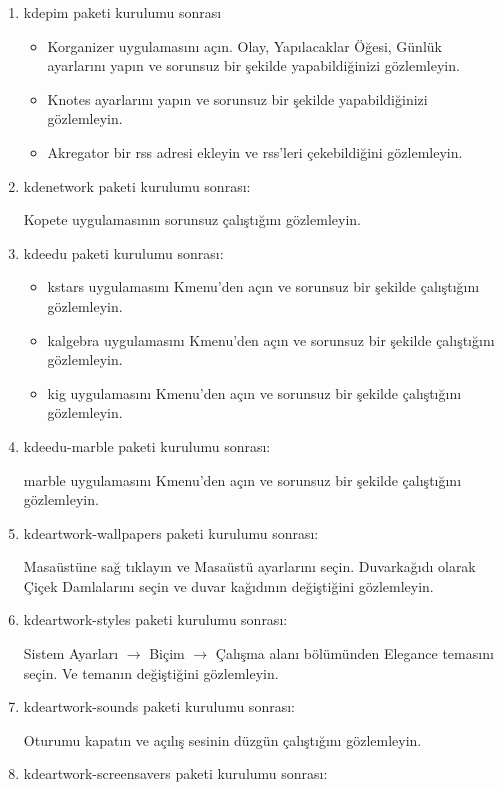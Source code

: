 \documentclass[a4paper,10pt]{article}
\begin{document}
\begin{enumerate}
\item kdepim paketi kurulumu sonrası
\begin{itemize}
 \item Korganizer uygulamasını açın. Olay, Yapılacaklar Öğesi, Günlük ayarlarını yapın ve sorunsuz bir şekilde yapabildiğinizi gözlemleyin.
 \item Knotes ayarlarını yapın ve sorunsuz bir şekilde yapabildiğinizi gözlemleyin.
 \item Akregator bir rss adresi ekleyin ve rss'leri çekebildiğini gözlemleyin.
\end{itemize}

\item kdenetwork paketi kurulumu sonrası: 

Kopete uygulamasının sorunsuz çalıştığını gözlemleyin.

\item kdeedu paketi kurulumu sonrası: 
\begin{itemize}
 \item kstars uygulamasını Kmenu'den açın ve sorunsuz bir şekilde çalıştığını gözlemleyin. 
 \item kalgebra uygulamasını Kmenu'den açın ve sorunsuz bir şekilde çalıştığını gözlemleyin. 
 \item kig uygulamasını Kmenu'den açın ve sorunsuz bir şekilde çalıştığını gözlemleyin. 
\end{itemize}

\item kdeedu-marble paketi kurulumu sonrası: 

marble uygulamasını Kmenu'den açın ve sorunsuz bir şekilde çalıştığını gözlemleyin. 
\item kdeartwork-wallpapers paketi kurulumu sonrası: 

Masaüstüne sağ tıklayın ve Masaüstü ayarlarını seçin. Duvarkağıdı olarak Çiçek Damlalarını seçin ve duvar kağıdının değiştiğini gözlemleyin.

\item kdeartwork-styles paketi kurulumu sonrası: 

Sistem Ayarları $\rightarrow$ Biçim $\rightarrow$ Çalışma alanı bölümünden Elegance temasını seçin. Ve temanın değiştiğini gözlemleyin.

\item kdeartwork-sounds paketi kurulumu sonrası:

Oturumu kapatın ve açılış sesinin düzgün çalıştığını gözlemleyin.

\item kdeartwork-screensavers paketi kurulumu sonrası:


\end{enumerate}
\end{document}

